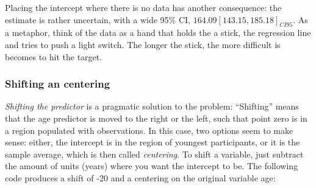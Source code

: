 \documentclass[]{svmono}
\newenvironment{Shaded}{\begin{snugshade}}{\end{snugshade}}
\newcommand{\KeywordTok}[1]{\textcolor[rgb]{0.13,0.29,0.53}{\textbf{#1}}}
\newcommand{\DataTypeTok}[1]{\textcolor[rgb]{0.13,0.29,0.53}{#1}}
\newcommand{\DecValTok}[1]{\textcolor[rgb]{0.00,0.00,0.81}{#1}}
\newcommand{\StringTok}[1]{\textcolor[rgb]{0.31,0.60,0.02}{#1}}
\newcommand{\OperatorTok}[1]{\textcolor[rgb]{0.81,0.36,0.00}{\textbf{#1}}}
\newcommand{\NormalTok}[1]{#1}
\begin{document}
Placing the intercept where there is no data has another consequence:
the estimate is rather uncertain, with a wide 95\% CI,
\(164.09 [143.15, 185.18]_{CI95}\). As a metaphor, think of the data as
a hand that holds the a stick, the regression line and tries to push a
light switch. The longer the stick, the more difficult is becomes to hit
the target.

\subsubsection{Shifting an centering}\label{shifting-an-centering}

\emph{Shifting the predictor} is a pragmatic solution to the problem:
``Shifting'' means that the age predictor is moved to the right or the
left, such that point zero is in a region populated with observations.
In this case, two options seem to make sense: either, the intercept is
in the region of youngest participants, or it is the sample average,
which is then called \emph{centering}. To shift a variable, just
subtract the amount of units (years) where you want the intercept to be.
The following code produces a shift of -20 and a centering on the
original variable age:

\begin{Shaded}
\end{Shaded}
\end{document}
